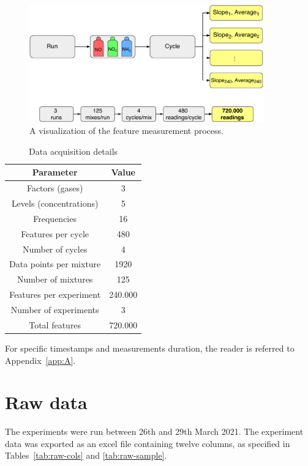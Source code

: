 \begin{figure}[h]
	\centering
	\includegraphics[width=0.9\textwidth]{../figures/features.pdf}
	\caption{A visualization of the feature measurement process.}
	\label{fig:features}
\end{figure}


\begin{table}[!ht]
	\centering
	\caption{Data acquisition details}
	\label{tab:measurements}
	\begin{tabular}{|c|c|}
		\hline
		\textbf{Parameter} & \textbf{Value} \\
		\hline
		Factors (gases) & 3 \\
		\hline
		Levels (concentrations) & 5 \\
		\hline
		Frequencies & 16 \\
		\hline
		Features per cycle & 480 \\
		\hline
		Number of cycles & 4 \\
		\hline
		Data points per mixture & 1920\\
		\hline
		Number of mixtures & 125 \\
		\hline
		Features per experiment & 240.000 \\
		\hline
		Number of experiments & 3 \\
		\hline
		Total features & 720.000 \\
		\hline
	\end{tabular}
\end{table}

For specific timestamps and measurements duration, the reader is referred to Appendix~\ref{app:A}.

\newpage
\section{Raw data}
\label{sec:raw-data}

The experiments were run between 26th and 29th March 2021. The experiment data was exported as an excel file containing twelve columns, as specified in Tables~\ref{tab:raw-cols} and \ref{tab:raw-sample}.

